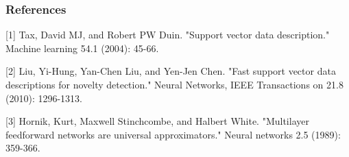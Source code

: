 \documentclass{article} %
\begin{document}





\subsubsection*{References}

\small{
[1] Tax, David MJ, and Robert PW Duin. "Support vector data description." Machine learning 54.1 (2004): 45-66. 

[2] Liu, Yi-Hung, Yan-Chen Liu, and Yen-Jen Chen. "Fast support vector data descriptions for novelty detection." Neural Networks, IEEE Transactions on 21.8 (2010): 1296-1313.

[3] Hornik, Kurt, Maxwell Stinchcombe, and Halbert White. "Multilayer feedforward networks are universal approximators." Neural networks 2.5 (1989): 359-366.
}
\end{document}
